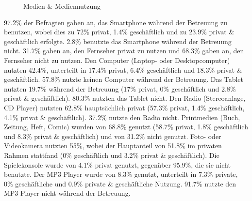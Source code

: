 \begin{figure}[hbt]
\caption{Medien \& Mediennutzung}\label{fig:Mediennutzung}
\centering
{}
\end{figure}

97.2\% der Befragten gaben an, das Smartphone während der Betreuung zu benutzen, wobei dies zu 72\% privat, 1.4\% geschäftlich und zu 23.9\% privat \& geschäftlich erfolgte. 2.8\% benutzte das Smartphone während der Betreuung nicht. 31.7\% gaben an, den Fernseher privat zu nutzen und 68.3\% gaben an, den Fernseher nicht zu nutzen. Den Computer (Laptop- oder Desktopcomputer) nutzten 42.4\%, unterteilt in 17.4\% privat, 6.4\% geschäftlich und 18.3\% privat \& geschäftlich. 57.8\% nutzte keinen Computer während der Betreuung. Das Tablet nutzten 19.7\% während der Betreuung (17\% privat, 0\% geschäftlich und 2.8\% privat \& geschäftlich). 80.3\% nutzten das Tablet nicht. Den Radio (Stereoanlage, CD Player) nutzten 62.8\% hauptsächlich privat (57.3\% privat, 1.4\% geschäftlich, 4.1\% privat \& geschäftlich). 37.2\% nutzte den Radio nicht. Printmedien (Buch, Zeitung, Heft, Comic) wurden von 68.8\% genutzt (58.7\% privat, 1.8\% geschäftlich und 8.3\% privat \& geschäftlich) und von 31.2\% nicht genutzt. Foto- oder Videokamera nutzten 55\%, wobei der Hauptanteil von 51.8\% im privaten Rahmen stattfand (0\% geschäftlich und 3.2\% privat \& geschäftlich). Die Spielekonsole wurde von 4.1\% privat genutzt, gegenüber 95.9\%, die sie nicht benutzte. Der MP3 Player wurde von 8.3\% genutzt, unterteilt in 7.3\% private, 0\% geschäftliche und 0.9\% private \& geschäftliche Nutzung. 91.7\% nutzte den MP3 Player nicht während der Betreuung.

